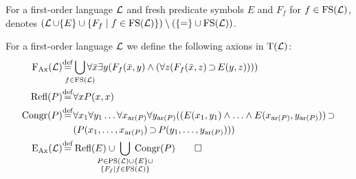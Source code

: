 \begin{defi}
	For a first-order language $\operatorname{\mathcal{L}}$ and fresh predicate symbols $E$ and $F_f$ for $f\in \operatorname{FS}(\operatorname{\mathcal{L}})$, 
	 denotes $(\LangSym \cup \{E\}\cup\{F_f\mid f \in\nolinebreak \FS(\LangSym)\}) \setminus\allowbreak (\{=\nolinebreak \} \cup\nolinebreak \FS(\LangSym))$.
\end{defi}

\begin{defi}
	For a first-order language $\operatorname{\mathcal{L}}$ we define the following axions in $\operatorname{T}(\operatorname{\mathcal{L}})$:\nopagebreak
	\begin{align*}
		\FAX(\LangSym) \defeq{}& \smashoperator{\bigcup_{f \in \FS(\LangSym)}}  \forall \bar x \exists y (F_f(\bar x, y) \land (\forall z (F_f(\bar x, z) \limpl E(y, z)))) \\
		\Refl(P) \defeq{}& \forall x P(x,x)  \\ 
		\Congr(P) \defeq{}& 
\forall x_1 \forall y_1 \ldots \forall x_{\ar(P)} \forall y_{\ar(P)} 
(( E(x_1,y_1) \land \ldots \land E(x_{\ar(P)},  y_{\ar(P)})) \limpl  \\
 & (P(x_1, \ldots, x_{\ar(P)}) \limpl P(y_1, \ldots, y_{\ar(P)}) )) \\
		\EAX(\LangSym) \defeq{}& \Refl(E) \cup \;\smashoperator{\bigcup_{\substack{P \in\PS(\LangSym)\cup\{E\}\cup\\ \{F_f\mid f\in \FS(\LangSym)\}}}}\; \Congr(P)
\qedhere
\end{align*}
\end{defi}

